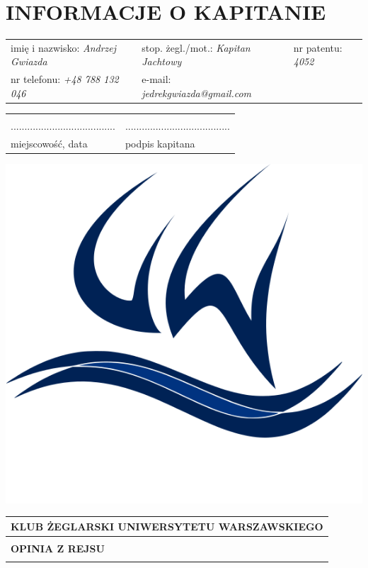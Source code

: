 \documentclass{article}
\begin{document}
\section*{INFORMACJE O KAPITANIE}
\begin{tabularx}{\textwidth}{X X X}
imię i nazwisko: \textit{Andrzej Gwiazda} & stop. żegl./mot.: \textit{Kapitan Jachtowy} & nr patentu: \textit{4052} \\
nr telefonu: \textit{+48 788 132 046} & e-mail: \textit{jedrekgwiazda@gmail.com} \\
\end{tabularx}

\begin{tabularx}{\textwidth}{X X}
\\\\
...................................... & ......................................\\
miejscowość, data & podpis kapitana\\
\end{tabularx}
\newpage
\begin{minipage}{0.11\textwidth}
\includegraphics[width=\textwidth]{logo.png}
\end{minipage}
\begin{minipage}{0.89\textwidth}
\begin{tabularx}{\textwidth} { 
  | >{\centering\arraybackslash}X | }
 \hline
 \textbf{KLUB ŻEGLARSKI UNIWERSYTETU WARSZAWSKIEGO} \\
 \hline
 \\
 \textbf{\huge OPINIA Z REJSU} \\
 \\
\hline
\end{tabularx}
\end{minipage}
\end{document}
